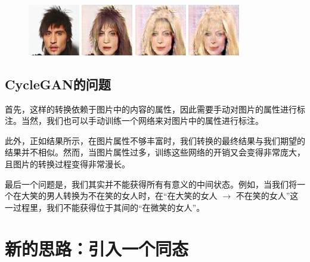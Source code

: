 \documentclass[UTF8,a4paper，12pt]{article}
\theoremstyle{theorem}
\theoremstyle{definition}
\begin{document}
\begin{figure}[htbp]
	\centering
	\includegraphics[width=0.2\textwidth]{assets/14-0}
	\includegraphics[width=0.2\textwidth]{assets/14-1}
	\includegraphics[width=0.2\textwidth]{assets/14-2}
	\includegraphics[width=0.2\textwidth]{assets/14-3}
	\caption{}
\end{figure}

\subsection{CycleGAN的问题}

首先，这样的转换依赖于图片中的内容的属性，因此需要手动对图片的属性进行标注。当然，我们也可以手动训练一个网络来对图片中的属性进行标注。

此外，正如结果所示，在图片属性不够丰富时，我们转换的最终结果与我们期望的结果并不相似。然而，当图片属性过多，训练这些网络的开销又会变得非常庞大，且图片的转换过程变得非常漫长。

最后一个问题是，我们其实并不能获得所有有意义的中间状态。例如，当我们将一个在大笑的男人转换为不在笑的女人时，在“在大笑的女人 $\rightarrow$ 不在笑的女人”这一过程里，我们不能获得位于其间的“在微笑的女人”。

\section{新的思路：引入一个同态}
\end{document}
